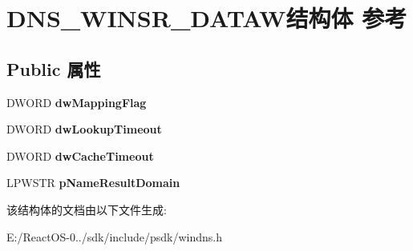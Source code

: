 \hypertarget{struct_d_n_s___w_i_n_s_r___d_a_t_a_w}{}\section{D\+N\+S\+\_\+\+W\+I\+N\+S\+R\+\_\+\+D\+A\+T\+A\+W结构体 参考}
\label{struct_d_n_s___w_i_n_s_r___d_a_t_a_w}
\subsection*{Public 属性}
\begin{DoxyCompactItemize}
\item 
\mbox{\label{struct_d_n_s___w_i_n_s_r___d_a_t_a_w_a6e966b6cf5d3006980f0604eece844e4}} 
D\+W\+O\+RD {\bfseries dw\+Mapping\+Flag}
\item 
\mbox{\label{struct_d_n_s___w_i_n_s_r___d_a_t_a_w_aad9cd9b19f35059ea1174f12bd9c6c6e}} 
D\+W\+O\+RD {\bfseries dw\+Lookup\+Timeout}
\item 
\mbox{\label{struct_d_n_s___w_i_n_s_r___d_a_t_a_w_a89cdc9dee45e9c414d84a482c05dd2e3}} 
D\+W\+O\+RD {\bfseries dw\+Cache\+Timeout}
\item 
\mbox{\label{struct_d_n_s___w_i_n_s_r___d_a_t_a_w_af064a4576d988c7ffa1d9e173c122d6b}} 
L\+P\+W\+S\+TR {\bfseries p\+Name\+Result\+Domain}
\end{DoxyCompactItemize}


该结构体的文档由以下文件生成\+:\begin{DoxyCompactItemize}
\item 
E\+:/\+React\+O\+S-\/0../sdk/include/psdk/windns.\+h\end{DoxyCompactItemize}

